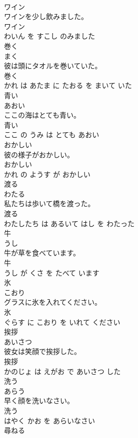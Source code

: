 \documentclass[8pt]{extreport}
\begin{document}
\begin{CJK}{UTF8}{min}
\\	ワイン	
\\	ワインを少し飲みました。	
\\	ワイン 
\\	わいん を すこし のみました			
\\	巻く	
\\	まく			
\\	彼は頭にタオルを巻いていた。	
\\	巻く 
\\	かれ は あたま に たおる を まいて いた			
\\	青い	
\\	あおい			
\\	ここの海はとても青い。	
\\	青い 
\\	ここ の うみ は とても あおい			
\\	おかしい	
\\	彼の様子がおかしい。	
\\	おかしい 
\\	かれ の ようす が おかしい			
\\	渡る	
\\	わたる			
\\	私たちは歩いて橋を渡った。	
\\	渡る 
\\	わたしたち は あるいて はし を わたった			
\\	牛	
\\	うし			
\\	牛が草を食べています。	
\\	牛 
\\	うし が くさ を たべて います			
\\	氷	
\\	こおり			
\\	グラスに氷を入れてください。	
\\	氷 
\\	ぐらす に こおり を いれて ください			
\\	挨拶	
\\	あいさつ			
\\	彼女は笑顔で挨拶した。	
\\	挨拶 
\\	かのじょ は えがお で あいさつ した			
\\	洗う	
\\	あらう			
\\	早く顔を洗いなさい。	
\\	洗う 
\\	はやく かお を あらいなさい			
\\	尋ねる	

\end{CJK}
\end{document}
